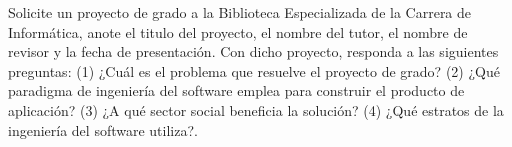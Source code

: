 Solicite un proyecto de grado a la Biblioteca Especializada de la Carrera de Informática, anote el titulo del proyecto, el nombre del tutor, el nombre de revisor y la fecha de presentación. Con dicho proyecto, responda a las siguientes preguntas: (1) ¿Cuál es el problema que resuelve el proyecto de grado? (2) ¿Qué paradigma de ingeniería del software emplea para construir el producto de aplicación? (3) ¿A qué sector social beneficia la solución? (4) ¿Qué estratos de la ingeniería del software utiliza?.
